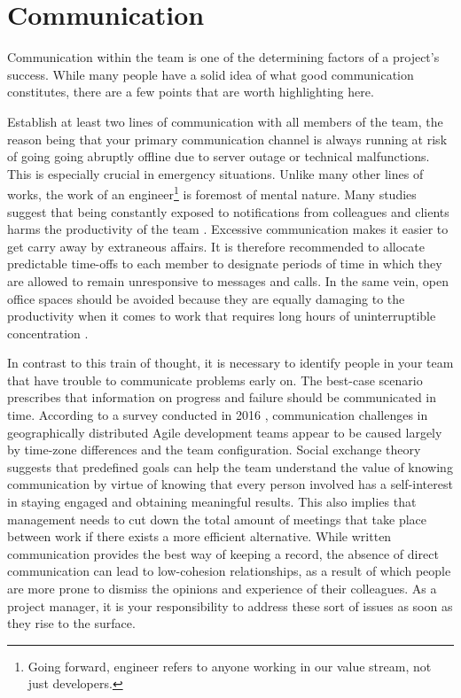 \section{Communication}

Communication within the team is one of the determining factors of a project's
success. While many people have a solid idea of what good communication constitutes,
there are a few points that are worth highlighting here.

Establish at least two lines of communication with all members of the team, the
reason being that your primary communication channel is always running at risk
of going going abruptly offline due to server outage or technical malfunctions.
This is especially crucial in emergency situations. Unlike many other lines of
works, the work of an engineer\footnote{Going forward, engineer refers to anyone
working in our value stream, not just developers.} is foremost of mental nature.
Many studies suggest that being constantly exposed to notifications from colleagues
and clients harms the productivity of the team \autocite{harvard2009}. Excessive
communication makes it easier to get carry away by extraneous affairs. It is therefore
recommended to allocate predictable time-offs to each member to designate periods
of time in which they are allowed to remain unresponsive to messages and calls.
In the same vein, open office spaces should be avoided because they are equally
damaging to the productivity when it comes to work that requires long hours of
uninterruptible concentration \autocite{yermolaieva2020} \autocite{deepwork2016}.

In contrast to this train of thought, it is necessary to identify people in your
team that have trouble to communicate problems early on. The best-case scenario
prescribes that information on progress and failure should be communicated in
time. According to a survey conducted in 2016 \autocite{yermolaieva2020}, communication
challenges in geographically distributed Agile development teams appear to be caused
largely by time-zone differences and the team configuration. Social exchange theory
suggests that predefined goals can help the team understand the value of knowing
communication by virtue of knowing that every person involved has a self-interest
in staying engaged and obtaining meaningful results. This also implies that management
needs to cut down the total amount of meetings that take place between work if
there exists a more efficient alternative. While written communication provides
the best way of keeping a record, the absence of direct communication can lead to
low-cohesion relationships, as a result of which people are more prone to dismiss
the opinions and experience of their colleagues. As a project manager, it is your
responsibility to address these sort of issues as soon as they rise to the surface.
